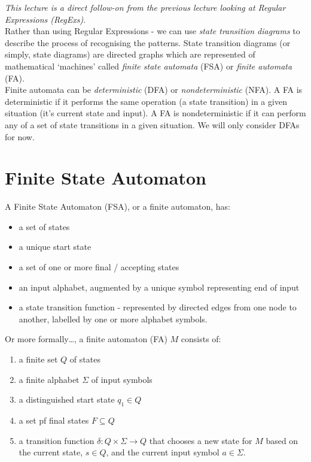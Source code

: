 
\textit{This lecture is a direct follow-on from the previous lecture looking at Regular Expressions (RegExs)}.\\

Rather than using Regular Expressions - we can use \textit{state transition diagrams} to describe the process of recognising the patterns. State transition diagrams (or simply, state diagrams) are directed graphs which are represented of mathematical `machines' called \textit{finite state automata} (FSA) or \textit{finite automata} (FA). \\

Finite automata can be \textit{deterministic} (DFA) or \textit{nondeterministic} (NFA). A FA is deterministic if it performs the same operation (a state transition) in a given situation (it's current state and input). A FA is nondeterministic if it can perform any of a set of state transitions in a given situation. We will only consider DFAs for now.

\section{Finite State Automaton}
A Finite State Automaton (FSA), or a finite automaton, has:
\begin{itemize}
    \item a set of states
    \item a unique start state
    \item a set of one or more final / accepting states
    \item an input alphabet, augmented by a unique symbol representing end of input
    \item a state transition function - represented by directed edges from one node to another, labelled by one or more alphabet symbols. 
\end{itemize}

Or more formally\ldots, a finite automaton (FA) $M$ consists of:
\begin{enumerate}
    \item a finite set $Q$ of states
    \item a finite alphabet $\Sigma$ of input symbols
    \item a distinguished start state $q_1 \in Q$
    \item a set pf final states $F \subseteq Q$
    \item a transition function $\delta : Q \times \Sigma \rightarrow Q$ that chooses a new state for $M$ based on the current state, $s \in Q$, and the current input symbol $a \in \Sigma$.
\end{enumerate}

